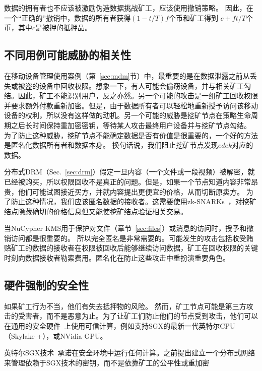 \documentclass[longbibliography,nofootinbib]{revtex4-1}
\newcommand{\kms}{NuCypher KMS}
\begin{document}
    数据的拥有者也不应该被激励伪造数据挑战矿工，应该使用撤销策略。 因此，在一个“正确的”撤销中，数据的所有者获得$(1 - t/T) f$个币和矿工得到 $c + ft/T$个币，其中$c$是被押的抵押品。
\subsection{不同用例可能威胁的相关性}


    在移动设备管理使用案例（第~\ref{sec:mdm}节）中，最重要的是在数据泄露之前从丢失或被盗的设备中回收权限。想象一下，有人可能会偷窃设备，并与相关矿工勾结。因此，矿工不能识别用户，反之亦然。另一个可能的攻击是一组矿工回收权限并要求额外付款重新加密。但是，由于数据所有者可以轻松地重新授予访问该移动设备的权利，所以没有这样做的动机。另一个可能的威胁是挖矿节点在策略生命周期之后长时间保持重加密密钥，等待某人攻击最终用户设备并与挖矿节点勾结。 为了防止这种威胁，挖矿节点不能确定数据是否有价值是很重要的，一个好的方法是匿名化数据所有者和数据本身。 换句话说，我们阻止挖矿节点发现$edek$对应的数据。
    
    分布式DRM（Sec.~\ref{sec:drm}）假定一旦内容（一个文件或一段视频）被解密，就已经被购买，所以权限回收不是真正的问题。但是，如果一个节点知道内容非常昂贵，他们可能试图接近买方，并就内容提出更便宜的价格，从而切断原卖方。 为了防止这种情况，我们应该匿名数据的接收者。这需要使用zk-SNARKs~\cite{consensys-snarks}，对挖矿结点隐藏确切的价格信息但又能使挖矿结点验证相关交易。


    当\kms 用于保护对文件（章节~\ref{sec:files}）或消息的访问时，授予和撤销访问都是很重要的。 所以完全匿名是非常需要的。可能发生的攻击包括收受贿赂矿工的数据的接收者在权限被回收后能够继续访问数据，矿工在回收权限的关键时刻向数据接收者勒索费用。匿名化在防止这些攻击中重扮演重要角色。


\subsection{硬件强制的安全性}

	如果矿工行为不当，他们有失去抵押物的风险。 然而，矿工节点可能是第三方攻击的受害者，而不是恶意为止。为了让矿工们防止他们的节点受到攻击，他们可以在通用的安全硬件~\cite{Yang2011}上使用可信计算，例如支持SGX的最新一代英特尔CPU（Skylake +），或NVidia GPU。
    
    英特尔SGX技术~\cite{wiki:sgx}承诺在安全环境中运行任何计算。之前提出建立一个分布式网络来管理依赖于SGX技术的密钥，而不是依靠矿工的公平性或重加密~\cite{sgx-blockchain-encryption}
    
\end{document}
